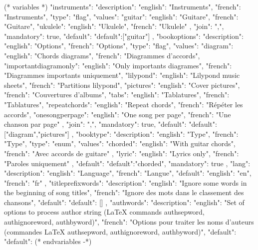 (* variables *)
{
"instruments": {"description": {"english": "Instruments", "french": "Instruments"},
               "type": "flag",
               "values": {"guitar": {"english": "Guitare", "french": "Guitare"},
                          "ukulele": {"english": "Ukulele", "french": "Ukulele"}
                         },
               "join": ",",
               "mandatory": true,
               "default": {"default":["guitar"]}
            },
"bookoptions": {"description": {"english": "Options", "french": "Options"},
               "type": "flag",
               "values": {"diagram": {"english": "Chords diagrams", "french": "Diagrammes d'accords"},
                          "importantdiagramonly": {"english": "Only importants diagrames", "french": "Diagrammes importants uniquement"},
                          "lilypond": {"english": "Lilypond music sheets", "french": "Partitions lilypond"},
                          "pictures": {"english": "Cover pictures", "french": "Couvertures d'albums"},
                          "tabs": {"english": "Tablatures", "french": "Tablatures"},
                          "repeatchords": {"english": "Repeat chords", "french": "Répéter les accords"},
                          "onesongperpage": {"english": "One song per page", "french": "Une chanson par page"}
                       },
               "join": ",",
               "mandatory": true,
               "default": {"default":["diagram","pictures"]}
            },
"booktype": {"description": {"english": "Type", "french": "Type"},
            "type": "enum",
            "values": {"chorded": {"english": "With guitar chords", "french": "Avec accords de guitare" },
                                   "lyric": {"english": "Lyrics only", "french": "Paroles uniquement"}
                     },
            "default": {"default":"chorded"},
            "mandatory": true
            },
"lang": {"description": {"english": "Language", "french": "Langue"},
         "default": {"english": "en", "french": "fr"}
      },
"titleprefixwords": {"description": {"english": "Ignore some words in the beginning of song titles",
                                     "french": "Ignore des mots dans le classement des chansons"},
                     "default": {"default": []}
                     },
"authwords": {"description": {"english": "Set of options to process author string (LaTeX commands authsepword, authignoreword, authbyword)",
                              "french": "Options pour traiter les noms d'auteurs (commandes LaTeX authsepword, authignoreword, authbyword)"},
               "default": {"default": {}}
               }
}
(* endvariables -*)


